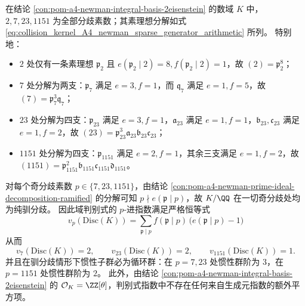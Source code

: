 \begin{conclusion}\label{con:pom-a4-newman-prime-ideal-decomposition-ramified}
在结论 \ref{con:pom-a4-newman-integral-basis-2eisenstein} 的数域 \(K\) 中，
\(2,7,23,1151\) 为全部分歧素数；其素理想分解如式 \eqref{eq:collision_kernel_A4_newman_sparse_generator_arithmetic} 所列。
特别地：
\begin{itemize}
  \item \(2\) 处仅有一条素理想 \(\mathfrak p_2\) 且 \(e(\mathfrak p_2\mid 2)=8,f(\mathfrak p_2\mid 2)=1\)，故 \((2)=\mathfrak p_2^{8}\)；
  \item \(7\) 处分解为两支：\(\mathfrak p_7\) 满足 \(e=3,f=1\)，而 \(\mathfrak q_7\) 满足 \(e=1,f=5\)，故 \((7)=\mathfrak p_7^{3}\mathfrak q_7\)；
  \item \(23\) 处分解为四支：\(\mathfrak p_{23}\) 满足 \(e=3,f=1\)，\(\mathfrak a_{23}\) 满足 \(e=1,f=1\)，\(\mathfrak b_{23},\mathfrak c_{23}\) 满足 \(e=1,f=2\)，故 \((23)=\mathfrak p_{23}^{3}\mathfrak a_{23}\mathfrak b_{23}\mathfrak c_{23}\)；
  \item \(1151\) 处分解为四支：\(\mathfrak p_{1151}\) 满足 \(e=2,f=1\)，其余三支满足 \(e=1,f=2\)，故 \((1151)=\mathfrak p_{1151}^{2}\mathfrak b_{1151}\mathfrak c_{1151}\mathfrak d_{1151}\)。
\end{itemize}
\end{conclusion}

\begin{conclusion}[判别式指数的驯分歧最小公式与局部惯性群阶]\label{con:pom-a4-newman-tame-discriminant-inertia}
对每个奇分歧素数 \(p\in\{7,23,1151\}\)，由结论 \ref{con:pom-a4-newman-prime-ideal-decomposition-ramified} 的分解可知 \(p\nmid e(\mathfrak p\mid p)\)，故 \(K/\QQ\) 在一切奇分歧处均为纯驯分歧。
因此域判别式的 \(p\)-进指数满足严格恒等式
\[
\boxed{\;
v_p(\mathrm{Disc}(K))=\sum_{\mathfrak p\mid p} f(\mathfrak p\mid p)\,\bigl(e(\mathfrak p\mid p)-1\bigr)\;}
\]
从而
\[
v_7(\mathrm{Disc}(K))=2,\qquad v_{23}(\mathrm{Disc}(K))=2,\qquad v_{1151}(\mathrm{Disc}(K))=1.
\]
并且在驯分歧情形下惯性子群必为循环群：在 \(p=7,23\) 处惯性群阶为 \(3\)，在 \(p=1151\) 处惯性群阶为 \(2\)。
此外，由结论 \ref{con:pom-a4-newman-integral-basis-2eisenstein} 的 \(\mathcal O_K=\ZZ[\theta]\)，判别式指数中不存在任何来自生成元指数的额外平方项。
\end{conclusion}

